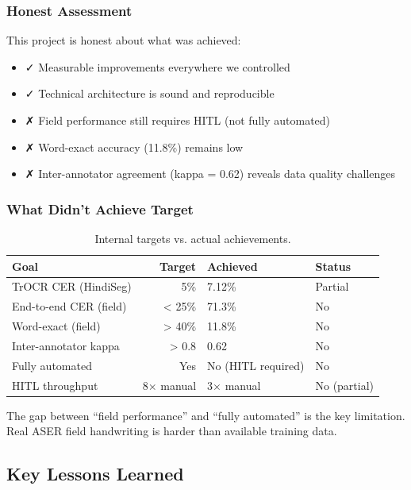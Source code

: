 \documentclass[14pt,a4paper]{article}
\begin{document}
\subsubsection{Honest Assessment}

This project is honest about what was achieved:
\begin{itemize}
    \item ✓ Measurable improvements everywhere we controlled
    \item ✓ Technical architecture is sound and reproducible
    \item ✗ Field performance still requires HITL (not fully automated)
    \item ✗ Word-exact accuracy (11.8\%) remains low
    \item ✗ Inter-annotator agreement (kappa = 0.62) reveals data quality challenges
\end{itemize}

\subsubsection{What Didn't Achieve Target}

\begin{table}[h]
    \centering
    \begin{tabular}{lrll}
        \toprule
        \textbf{Goal} & \textbf{Target} & \textbf{Achieved} & \textbf{Status} \\
        \midrule
        TrOCR CER (HindiSeg) & 5\% & 7.12\% & Partial \\
        End-to-end CER (field) & < 25\% & 71.3\% & No \\
        Word-exact (field) & > 40\% & 11.8\% & No \\
        Inter-annotator kappa & > 0.8 & 0.62 & No \\
        Fully automated & Yes & No (HITL required) & No \\
        HITL throughput & 8$\times$ manual & 3$\times$ manual & No (partial) \\
        \bottomrule
    \end{tabular}
    \caption{Internal targets vs. actual achievements.}
\end{table}

The gap between ``field performance'' and ``fully automated'' is the key limitation. Real ASER field handwriting is harder than available training data.

\subsection{Key Lessons Learned}
\end{document}
